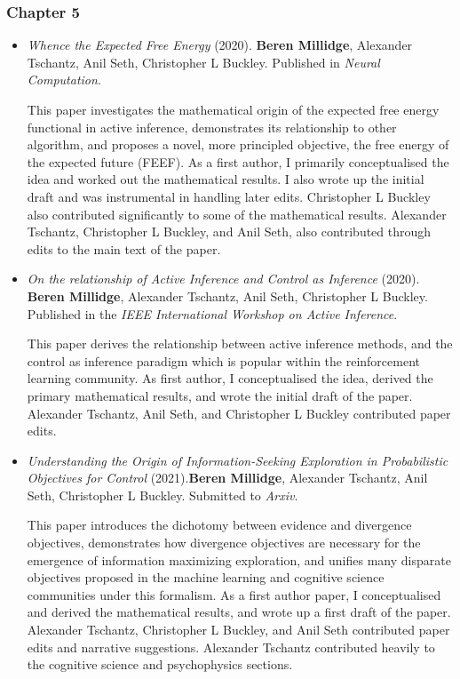 \subsubsection{Chapter 5}
\begin{itemize}

\item \emph{Whence the Expected Free Energy} (2020). \textbf{Beren Millidge}, Alexander Tschantz, Anil Seth, Christopher L Buckley. Published in \emph{Neural Computation}.

This paper investigates the mathematical origin of the expected free energy functional in active inference, demonstrates its relationship to other algorithm, and proposes a novel, more principled objective, the  free energy of the expected future (FEEF). As a first author, I primarily conceptualised the idea and worked out the mathematical results. I also wrote up the initial draft and was instrumental in handling later edits. Christopher L Buckley also contributed significantly to some of the mathematical results. Alexander Tschantz, Christopher L Buckley, and Anil Seth, also contributed through edits to the main text of the paper.

\item  \emph{On the relationship of Active Inference and Control as Inference} (2020). \textbf{Beren Millidge}, Alexander Tschantz, Anil Seth, Christopher L Buckley. Published in the \emph{IEEE International Workshop on Active Inference}.

This paper derives the relationship between active inference methods, and the control as inference paradigm which is popular within the reinforcement learning community. As first author, I conceptualised the idea, derived the primary mathematical results, and wrote the initial draft of the paper. Alexander Tschantz, Anil Seth,  and Christopher L Buckley contributed paper edits.

\item \emph{Understanding the Origin of Information-Seeking Exploration in Probabilistic Objectives for Control} (2021).\textbf{Beren Millidge}, Alexander Tschantz, Anil Seth, Christopher L Buckley. Submitted to \emph{Arxiv}. 

This paper introduces the dichotomy between evidence and divergence objectives, demonstrates how divergence objectives are necessary for the emergence of information maximizing exploration, and unifies many disparate objectives proposed in the machine learning and cognitive science communities under this formalism. As a first author paper, I conceptualised and derived the mathematical results, and wrote up a first draft of the paper. Alexander Tschantz, Christopher L Buckley, and Anil Seth contributed paper edits and narrative suggestions. Alexander Tschantz contributed heavily to the cognitive science and psychophysics sections.
\end{itemize}

